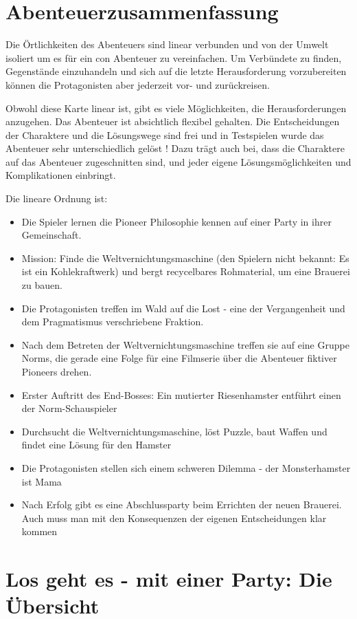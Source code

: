 \section{Abenteuerzusammenfassung}

Die Örtlichkeiten des Abenteuers sind linear verbunden und von der Umwelt isoliert um es für ein con Abenteuer zu vereinfachen. Um Verbündete zu finden, Gegenstände einzuhandeln und sich auf die letzte Herausforderung vorzubereiten können die Protagonisten aber jederzeit vor- und zurückreisen.

Obwohl diese Karte linear ist, gibt es viele Möglichkeiten, die Herausforderungen anzugehen. Das Abenteuer ist absichtlich flexibel gehalten. Die Entscheidungen der Charaktere und die Lösungswege sind frei und in Testspielen wurde das Abenteuer sehr unterschiedlich gelöst ! Dazu trägt auch bei, dass die Charaktere auf das Abenteuer zugeschnitten sind, und jeder eigene Lösungsmöglichkeiten und Komplikationen einbringt.

Die lineare Ordnung ist:

\begin{itemize}
\item Die Spieler lernen die Pioneer Philosophie kennen auf einer Party in ihrer Gemeinschaft.
\item Mission: Finde die Weltvernichtungsmaschine (den Spielern nicht bekannt: Es ist ein Kohlekraftwerk) und bergt recycelbares Rohmaterial, um eine Brauerei zu bauen.
\item Die Protagonisten treffen im Wald auf die Lost - eine der Vergangenheit und dem Pragmatismus verschriebene Fraktion.
\item Nach dem Betreten der Weltvernichtungsmaschine treffen sie auf eine Gruppe Norms, die gerade eine Folge für eine Filmserie über die Abenteuer fiktiver Pioneers drehen.
\item Erster Auftritt des End-Bosses: Ein mutierter Riesenhamster entführt einen der Norm-Schauspieler
\item Durchsucht die Weltvernichtungsmaschine, löst Puzzle, baut Waffen und findet eine Lösung für den Hamster
\item Die Protagonisten stellen sich einem schweren Dilemma - der Monsterhamster ist Mama
\item Nach Erfolg gibt es eine Abschlussparty beim Errichten der neuen Brauerei. Auch muss man mit den Konsequenzen der eigenen Entscheidungen klar kommen
\end{itemize}

\section{Los geht es - mit einer Party: Die Übersicht}

